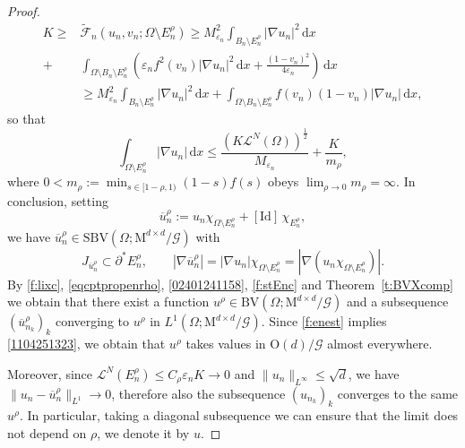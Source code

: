 \documentclass[a4paper,reqno]{amsart}
\newcommand{\BV}{\mathrm{BV}}
\newcommand{\SBV}{\mathrm{SBV}}
\newcommand\calL{\mathcal{L}}
\newcommand\Id{{\mathrm{Id}}}
\newcommand\eps{{\varepsilon}}
\theoremstyle{remark}
\def\e{\varepsilon}
\newcommand\dx{{\,\mathrm{d}x}}
\newcommand{\ol}{\overline}
\newcommand{\sm}{\setminus}
\newcommand{\F}{\mathcal{F}}
\newcommand{\G}{\mathcal{G}}
\newcommand{\tF}{\widetilde{\F}}
\newcommand{\On}{\mathrm{O}(d)}
\newcommand{\Mno}{\mathrm{M}^{d\times d}}
\newcommand{\LN}{\calL^N}
\numberwithin{equation}{section}
\begin{document}
\begin{proof}
\[\begin{split}
K\geq &  \tF_n(u_n, v_n; \Omega\setminus E^\rho_n) \geq M_{\varepsilon_n}^2 \int_{B_n\setminus E_n^\rho}    |\nabla u_n|^2 \dx  \\  + &
\int_{\Omega \setminus B_n\setminus E_n^\rho }  \left( \e_nf^2(v_n) |\nabla u_n|^2 \dx  +
\frac{(1-v_n)^2}{4\e_n}  \right)\dx \\ &
\geq M_{\varepsilon_n}^2 \int_{B_n\setminus E_n^\rho}  |\nabla u_n|^2 \dx +
\int_{\Omega \setminus B_n\setminus E_n^\rho }   f(v_n) (1-v_n) |\nabla u_n| \dx, 
\end{split} \] 
so that 
\begin{equation}\label{f:stEnc}
\int_{{\Omega \setminus E_n^\rho } }
|\nabla u_n| \dx\leq \frac{(K\calL^N(\Omega))^{\frac 12}}{M_{\varepsilon_n}}+\frac{K}{m_\rho},
\end{equation}
where $0<m_\rho:=\min_{s\in [1-\rho,1)}(1-s)f(s)$
obeys $\lim_{\rho\to0} m_\rho=\infty$. 
 In conclusion, setting
	\begin{equation}\label{01203242202}
		\ol u_n^\rho:=u_n \chi_{\Omega\sm E_n^\rho} +[\Id]\,  \chi_{E_n^\rho} ,
	\end{equation}
	we have $\ol u_n^\rho \in \SBV(\Omega;\Mno/\G)$ with
	\begin{equation}\label{02401241158}
		J_{\ol u_n^\rho}\subset  \partial^* E_n^\rho, \qquad  |\nabla \ol u_n^\rho| = |\nabla u_n| \chi_{\Omega\sm E_n^\rho}= |\nabla (u_n \chi_{\Omega\sm E_n^\rho})|.
	\end{equation}
By \eqref{f:lixc},  \eqref{eqcptpropenrho},
\eqref{02401241158},
\eqref{f:stEnc} and Theorem~\ref{t:BVXcomp} we
obtain that there exist a function  $u^\rho \in \BV(\Omega;\Mno/\G)$ and a subsequence $(\ol u_{n_k}^\rho)_k$ converging to $u^\rho$ in $L^1(\Omega;  \Mno  /\G)$.
Since \eqref{f:enest} implies \eqref{1104251323}, we obtain that $u^\rho$ takes values in $\On/\G$ almost everywhere.
	

Moreover, since $\LN(E_n^\rho)\le C_\rho \eps_n K\to0$ and $\|u_n\|_{L^\infty}\le \sqrt d$,
we have $\|u_n-\ol u^\rho_n\|_{L^1}\to0$, therefore also the subsequence
$(u_{n_k})_k$ converges to the same $u^\rho$. In particular,
taking a diagonal subsequence we can ensure that the limit does not depend on $\rho$, we denote it by $u$.
	

\end{proof}
\end{document}
